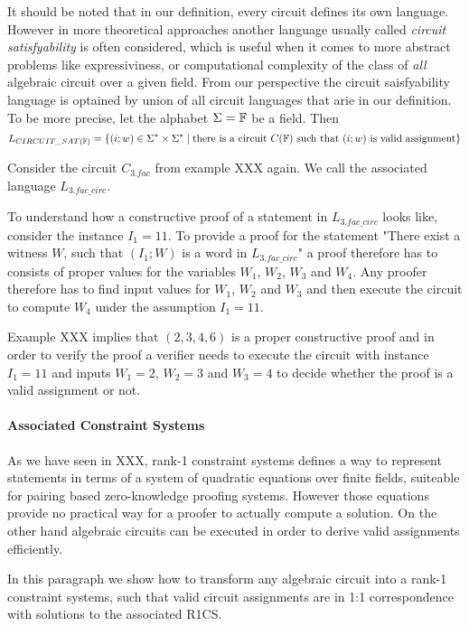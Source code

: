 \begin{remark} It should be noted that in our definition, every circuit defines its own language. However in more theoretical approaches another language usually called \textit{circuit satisfyability} is often considered, which is useful when it comes to more abstract problems like expressiviness, or computational complexity of the class of \textit{all} algebraic circuit over a given field. From our perspective the circuit saisfyability language is optained by union of all circuit languages that arie in our definition. To be more precise, let the alphabet $\Sigma=\mathbb{F}$ be a field. Then 
$$
L_{CIRCUIT\_SAT(\mathbb{F})} = \{(i;w)\in \Sigma^*\times \Sigma^*\;|\; \text{there is a circuit } C(\mathbb{F}) \text{ such that } (i;w) \text{ is valid assignment}\}
$$
\end{remark}
\begin{example}[3-Factorization]Consider the circuit $C_{3.fac}$ from example XXX again. We call the associated language $L_{3.fac\_circ}$.

To understand how a constructive proof of a statement in $L_{3.fac\_circ}$ looks like, consider the instance $I_1= 11$. To provide a proof for the statement "There exist a witness $W$, such that $(I_1;W)$ is a word in $L_{3.fac\_circ}$" a proof therefore has to consists of proper values for the variables $W_1$, $W_2$, $W_3$ and $W_4$. Any proofer therefore has to find input values for $W_1$, $W_2$ and $W_3$ and then execute the circuit to compute $W_4$ under the assumption $I_1=11$. 

Example XXX implies that $(2,3,4,6)$ is a proper constructive proof and in order to verify the proof a verifier needs to execute the circuit with instance $I_1=11$ and inputs $W_1=2$, $W_2=3$ and $W_3=4$ to decide whether the proof is a valid assignment or not. 
\end{example}
\paragraph{Associated Constraint Systems} As we have seen in XXX, rank-1 constraint systems defines a way to represent statements in terms of a system of quadratic equations over finite fields, suiteable for pairing based zero-knowledge proofing systems. However those equations provide no practical way for a proofer to actually compute a solution. On the other hand algebraic circuits can be executed in order to derive valid assignments efficiently. 

In this paragraph we show how to transform any algebraic circuit into a rank-1 constraint systems, such that valid circuit assignments are in 1:1 correspondence with solutions to the associated R1CS. 

